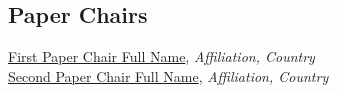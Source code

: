 
\subsection{Paper Chairs}
\href{https://orcid.org/0000-0001-2345-6789}{First Paper Chair Full Name}, \emph{Affiliation, Country}\\
\href{https://orcid.org/0000-0001-2345-6789}{Second Paper Chair Full Name}, \emph{Affiliation, Country}\\


